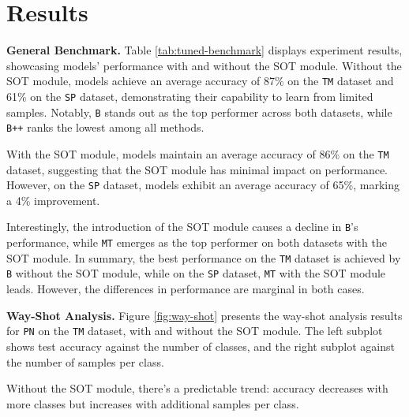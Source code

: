 \section{Results}
\textbf{General Benchmark.} Table \ref{tab:tuned-benchmark} displays experiment results, showcasing models' performance with and without the SOT module. 
Without the SOT module, models achieve an average accuracy of 87\% on the \texttt{TM} dataset and 61\% on the \texttt{SP} dataset, 
demonstrating their capability to learn from limited samples. Notably, \texttt{B} stands out as the top performer across both datasets, 
while \texttt{B++} ranks the lowest among all methods.

With the SOT module, models maintain an average accuracy of 86\% on the \texttt{TM} dataset, 
suggesting that the SOT module has minimal impact on performance. However, on the \texttt{SP} dataset, 
models exhibit an average accuracy of 65\%, marking a 4\% improvement.

Interestingly, the introduction of the SOT module causes a decline in \texttt{B}'s performance, 
while \texttt{MT} emerges as the top performer on both datasets with the SOT module. 
In summary, the best performance on the \texttt{TM} dataset is achieved by \texttt{B} without the SOT module, while on the \texttt{SP} dataset, 
\texttt{MT} with the SOT module leads. However, the differences in performance are marginal in both cases.




\textbf{Way-Shot Analysis.} Figure \ref{fig:way-shot} presents the way-shot analysis results for \texttt{PN} on the \texttt{TM} dataset, with and without the SOT module. 
The left subplot shows test accuracy against the number of classes, and the right subplot against the number of samples per class.

Without the SOT module, there's a predictable trend: accuracy decreases with more classes but increases with additional samples per class. 

